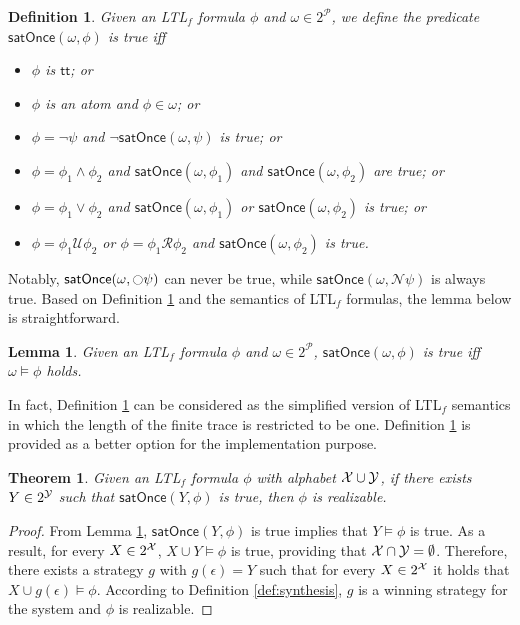 \documentclass[letterpaper]{article} %
\newcommand{\N}{\mathcal{N}} \newcommand{\R}{\mathcal{R}} \newcommand{\A}{\mathcal{A}}
\newcommand{\U}{\mathcal{U}} \newcommand{\V}{\mathcal{V}} %
\newcommand{\ltlf}{\textsf{LTL}$_f$\xspace}
\newcommand{\true}{\textsf{tt}\xspace}
\newtheorem{theorem}{Theorem}
\newtheorem{lemma}{Lemma}
\newtheorem{definition}{Definition}
\def\satOnce{\mathsf{satOnce}\xspace}
\begin{document}
\begin{definition}\label{def:satOnce}
Given an \ltlf formula $\phi$ and $\omega \in 2^{\mathcal{P}}$, we define the predicate $\satOnce (\omega, \phi)$ is true iff 
\begin{itemize}
	\item $\phi$ is $\true$; or
	\item $\phi$ is an atom and $\phi \in \omega$; or 
	\item $\phi = \neg\psi$ and $\neg \satOnce (\omega, \psi)$ is true; or
	\item $\phi = \phi_1\wedge\phi_2$ and $\satOnce (\omega, \phi_1)$ and $\satOnce (\omega, \phi_2)$ are true; or
	\item $\phi = \phi_1\vee\phi_2$ and $\satOnce (\omega, \phi_1)$ or $\satOnce (\omega, \phi_2)$ is true; or
	\item $\phi = \phi_1\U\phi_2$ or $\phi = \phi_1\R\phi_2$ and $\satOnce (\omega, \phi_2)$ is true.
\end{itemize} 
\end{definition}

Notably, $\satOnce (\omega, \ocircle\psi)$ can never be true, while $\satOnce (\omega, \N\psi)$ is always true. Based on Definition \ref{def:satOnce} and the semantics of \ltlf formulas, the lemma below is straightforward. 

\begin{lemma}\label{lem:satOnce}
Given an \ltlf formula $\phi$ and $\omega\in 2^{\mathcal{P}}$, $\satOnce (\omega, \phi)$ is true iff $\omega\models\phi$ holds.
\end{lemma}
In fact, Definition \ref{def:satOnce} can be considered as the simplified version of \ltlf semantics in which the length of the finite trace is restricted to be one. Definition \ref{def:satOnce} is provided as a better option for the implementation purpose. 

\begin{theorem}\label{thm:winning-1}
Given an \ltlf formula $\phi$ with alphabet $\mathcal{X}\cup \mathcal{Y}$, if there exists $Y\in 2^{\mathcal{Y}}$ such that $\satOnce (Y, \phi)$ is true, then $\phi$ is realizable. 
\end{theorem}
\begin{proof}
From Lemma \ref{lem:satOnce}, $\satOnce (Y, \phi)$ is true implies that $Y\models\phi$ is true. As a result, for every $X\in 2^{\mathcal{X}}$, $X\cup Y\models\phi$ is true, providing that $\mathcal{X}\cap \mathcal{Y}=\emptyset$. Therefore, there exists a strategy $g$ with $g(\epsilon) = Y$ such that for every $X\in 2^{\mathcal{X}}$ it holds that $X\cup g(\epsilon)\models\phi$. According to Definition \ref{def:synthesis}, $g$ is a winning strategy for the system and $\phi$ is realizable.
\end{proof}
\end{document}
